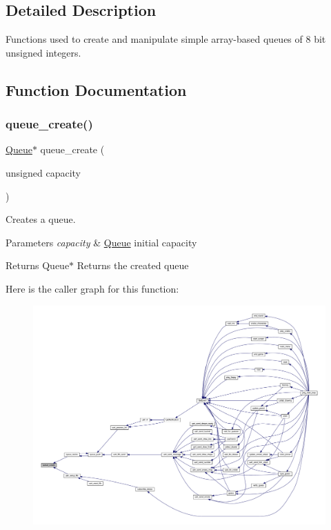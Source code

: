 \subsection{Detailed Description}
Functions used to create and manipulate simple array-\/based queues of 8 bit unsigned integers. 

\subsection{Function Documentation}
\mbox{\label{group__queue_ga735dfbf59094f36f47a83d3a139c9b09}} 
\subsubsection{\texorpdfstring{queue\+\_\+create()}{queue\_create()}}
{\footnotesize\ttfamily \mbox{\hyperlink{struct_queue}{Queue}}$\ast$ queue\+\_\+create (\begin{DoxyParamCaption}\item[{unsigned}]{capacity }\end{DoxyParamCaption})}



Creates a queue. 


\begin{DoxyParams}{Parameters}
{\em capacity} & \mbox{\hyperlink{struct_queue}{Queue}} initial capacity \\
\hline
\end{DoxyParams}
\begin{DoxyReturn}{Returns}
Queue$\ast$ Returns the created queue 
\end{DoxyReturn}
Here is the caller graph for this function\+:\nopagebreak
\begin{figure}[H]
\begin{center}
\leavevmode
\includegraphics[width=350pt]{group__queue_ga735dfbf59094f36f47a83d3a139c9b09_icgraph}
\end{center}
\end{figure}
\mbox{\label{group__queue_gad21ee75924298937673e2b8d66665466}} 
